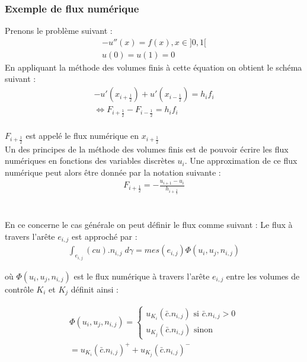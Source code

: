 \documentclass[12pt]{article}
\begin{document}
\subsubsection{Exemple de flux numérique}
\noindent Prenons le problème suivant :
\begin{eqnarray}
        -u''(x)=f(x) , x\in]0,1[
        \\u(0)=u(1)=0
\end{eqnarray}
En appliquant la méthode des volumes finis à cette équation on obtient le schéma suivant :
\begin{eqnarray}
        -u'(x_{i+\frac{1}{2}})+u'(x_{i-\frac{1}{2}})=h_if_i
        \\\Leftrightarrow F_{i+\frac{1}{2}} -F_{i-\frac{1}{2}} = h_if_i
\end{eqnarray}
\\
$F_{i+\frac{1}{2}}$ est appelé le flux numérique en $x_{i+\frac{1}{2}}$
\\Un des principes de la méthode des volumes finis est de pouvoir écrire les flux numériques en fonctions des variables discrètes $u_i$.
Une approximation de ce flux numérique peut alors être donnée par la notation suivante :
\\
\begin{eqnarray}
        F_{i+\frac{1}{2}} = -\frac{u_{i+1}-u_i}{h_{i+\frac{1}{2}}}
\end{eqnarray}
\\
\\En ce concerne le cas générale on peut définir le flux comme suivant :
Le flux à travers l'arête $e_{i,j}$ est approché par :
\begin{eqnarray}
       \int_{e_{i,j}} (cu).{n_{i,j}} \; d\gamma=mes(e_{i,j})\Phi(u_i,u_j,n_{i,j})
\end{eqnarray}

\noindent où $\Phi(u_i,u_j,n_{i,j})$ est le flux numérique à travers l'arête $e_{i,j}$ entre les volumes de contrôle $K_i$ et $K_j$ définit ainsi :

\begin{eqnarray}
       \Phi(u_i,u_j,n_{i,j})=
        \left\{ 
        \begin{array}{llll}
            u_{K_i}(\bar c.n_{i,j}) \text{ si }\bar c.n_{i,j}> 0 
            \\u_{K_j}(\bar c.n_{i,j}) \text{ sinon}
        \end{array}
    \right .
    \\=u_{K_i}(\bar c.n_{i,j})^+ + u_{K_j}(\bar c.n_{i,j})^-
\end{eqnarray}
\end{document}
